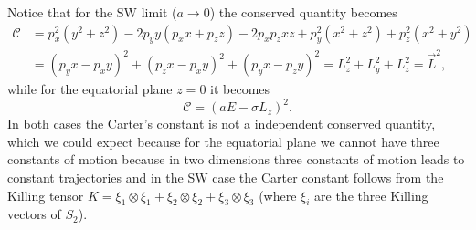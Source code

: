 Notice that for the \gls{SW} limit ($a \to 0$) the conserved quantity becomes
\begin{equation}
\begin{aligned}
 \mathcal{C}&= p_x^2 \left(y^2+z^2\right)-2 p_y y (p_x x+p_z z)-2 p_x p_z x z+p_y^2 \left(x^2+z^2\right)+p_z^2 \left(x^2+y^2\right) \nonumber\\
 &=(p_y x-p_x y)^2+(p_z x-p_x y)^2+(p_y x-p_z y)^2= L_z^2+L_y^2+L_z^2=\vec{L}^2,
 \end{aligned}
\end{equation}
while for the equatorial plane $z=0$ it becomes
\begin{equation}\label{Carterep}
\mathcal{C}=(a E-\sigma L_z)^2.
\end{equation}
In both cases the Carter's constant is not a independent conserved quantity, which we could expect because for the equatorial plane we cannot have three constants of motion because in two dimensions three constants of motion leads to constant trajectories and in the \gls{SW} case the Carter constant follows from the Killing tensor $K=\xi_1 \otimes \xi_1+\xi_2 \otimes \xi_2+\xi_3 \otimes \xi_3$ (where $\xi_i$ are the three Killing vectors of $S_2$).







